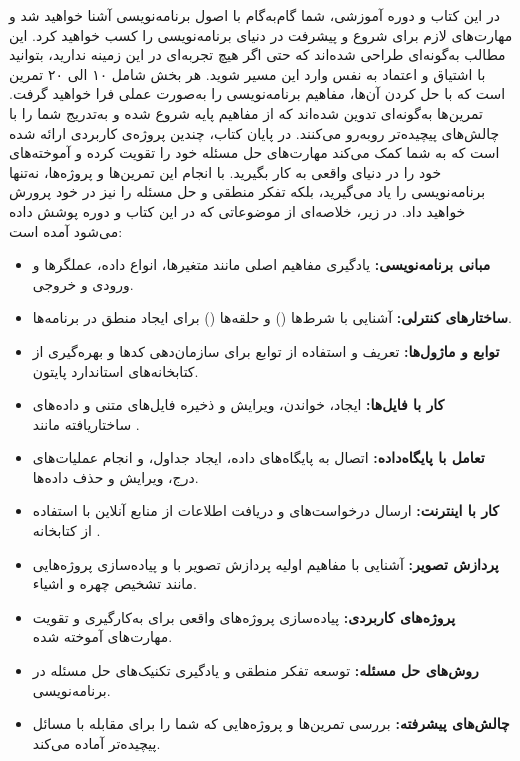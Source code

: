 \documentclass[b5paper,12pt]{article}
\begin{document}
	در این کتاب و دوره آموزشی، شما گام‌به‌گام با اصول برنامه‌نویسی آشنا خواهید شد و مهارت‌های لازم برای شروع و پیشرفت در دنیای برنامه‌نویسی را کسب خواهید کرد. این مطالب به‌گونه‌ای طراحی شده‌اند که حتی اگر هیچ تجربه‌ای در این زمینه ندارید، بتوانید با اشتیاق و اعتماد به نفس وارد این مسیر شوید. هر بخش شامل ۱۰ الی ۲۰ تمرین است که با حل کردن آن‌ها، مفاهیم برنامه‌نویسی را به‌صورت عملی فرا خواهید گرفت. تمرین‌ها به‌گونه‌ای تدوین شده‌اند که از مفاهیم پایه شروع شده و به‌تدریج شما را با چالش‌های پیچیده‌تر روبه‌رو می‌کنند. در پایان کتاب، چندین پروژه‌ی کاربردی ارائه شده است که به شما کمک می‌کند مهارت‌های حل مسئله خود را تقویت کرده و آموخته‌های خود را در دنیای واقعی به کار بگیرید. با انجام این تمرین‌ها و پروژه‌ها، نه‌تنها برنامه‌نویسی را یاد می‌گیرید، بلکه تفکر منطقی و حل مسئله را نیز در خود پرورش خواهید داد. در زیر، خلاصه‌ای از موضوعاتی که در این کتاب و دوره پوشش داده می‌شود آمده است:
	
	\begin{itemize}
		\item \textbf{مبانی برنامه‌نویسی:} یادگیری مفاهیم اصلی مانند متغیرها، انواع داده، عملگرها و ورودی و خروجی.
		\item \textbf{ساختارهای کنترلی:} آشنایی با شرط‌ها () و حلقه‌ها () برای ایجاد منطق در برنامه‌ها.
		\item \textbf{توابع و ماژول‌ها:} تعریف و استفاده از توابع برای سازمان‌دهی کدها و بهره‌گیری از کتابخانه‌های استاندارد پایتون.
		\item \textbf{کار با فایل‌ها:} ایجاد، خواندن، ویرایش و ذخیره فایل‌های متنی و داده‌های ساختاریافته مانند .
		\item \textbf{تعامل با پایگاه‌داده:} اتصال به پایگاه‌های داده، ایجاد جداول، و انجام عملیات‌های درج، ویرایش و حذف داده‌ها.
		\item \textbf{کار با اینترنت:} ارسال درخواست‌های  و دریافت اطلاعات از منابع آنلاین با استفاده از کتابخانه .
		\item \textbf{پردازش تصویر:} آشنایی با مفاهیم اولیه پردازش تصویر با  و پیاده‌سازی پروژه‌هایی مانند تشخیص چهره و اشیاء.
		\item \textbf{پروژه‌های کاربردی:} پیاده‌سازی پروژه‌های واقعی برای به‌کارگیری و تقویت مهارت‌های آموخته شده.
		\item \textbf{روش‌های حل مسئله:} توسعه تفکر منطقی و یادگیری تکنیک‌های حل مسئله در برنامه‌نویسی.
		\item \textbf{چالش‌های پیشرفته:} بررسی تمرین‌ها و پروژه‌هایی که شما را برای مقابله با مسائل پیچیده‌تر آماده می‌کند.
	\end{itemize}
	
\end{document}
